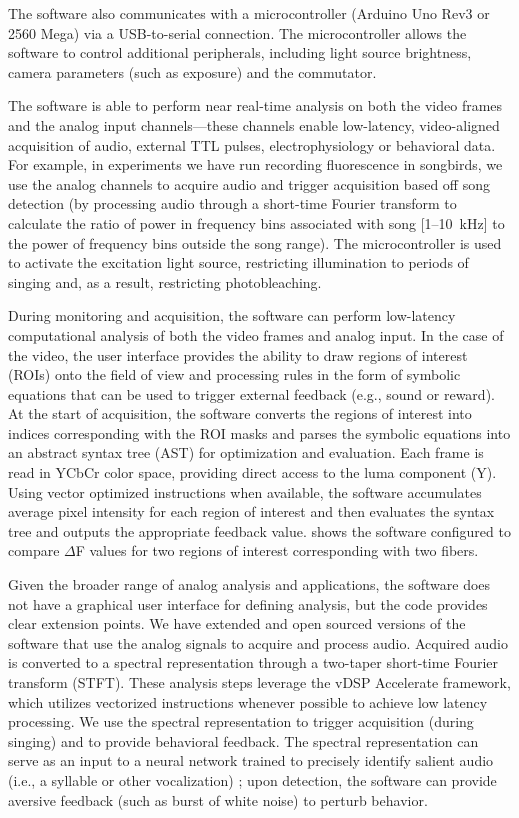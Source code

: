 The software also communicates with a microcontroller 
(Arduino Uno Rev3 or 2560 Mega) via a USB-to-serial connection. The 
microcontroller allows the software to control additional 
peripherals, including light source brightness, camera parameters 
(such as exposure) and the commutator.

The software is able to perform near real-time analysis on both the 
video frames and the analog input channels---these channels enable
low-latency, video-aligned acquisition of audio, external TTL 
pulses, electrophysiology or behavioral data. 
For example, in experiments we have run recording fluorescence in songbirds, 
we use the analog channels to acquire audio and trigger acquisition 
based off song detection (by processing audio through a short-time
Fourier transform to calculate the ratio of power in frequency 
bins associated with song [1--10~kHz] to the power of frequency bins outside 
the song range). The microcontroller is used to activate 
the excitation light source, restricting illumination to periods of 
singing and, as a result, restricting photobleaching. 

During monitoring and acquisition, the software can perform low-latency
computational analysis of both the video frames and analog input. In 
the case of the video, the user interface provides the ability to 
draw regions of interest (ROIs) onto the field of view and processing 
rules in the form of symbolic equations that can be used to trigger 
external feedback (e.g., sound or reward). At the start of
acquisition, the software converts the regions of interest into indices 
corresponding with the ROI masks and parses the symbolic equations 
into an abstract syntax tree (AST) for optimization and evaluation. 
Each frame is read in YCbCr color 
space, providing direct access to the luma component (Y). Using vector
optimized instructions when available, the software accumulates average 
pixel intensity for each region of interest and then evaluates the 
syntax tree and outputs the appropriate feedback value.  
shows the software configured to compare $\Delta$F values for two 
regions of interest corresponding with two fibers.

Given the broader range of analog analysis and applications, 
the software does not have a graphical 
user interface for defining analysis, but the code provides clear 
extension points. We have extended and open sourced versions 
of the software that use the analog signals to acquire and process 
audio. Acquired audio is converted to a spectral representation 
through a two-taper short-time Fourier transform (STFT). These 
analysis steps leverage the vDSP Accelerate framework, which 
utilizes vectorized instructions whenever possible to achieve 
low latency processing. We use the spectral representation to 
trigger acquisition (during singing) and to provide behavioral
feedback. The spectral 
representation can serve as an input to a neural network trained 
to precisely identify salient audio (i.e., a syllable or other 
vocalization) \cite{Pearre:2017cs}; upon detection, the software 
can provide aversive feedback (such as burst of white noise) 
to perturb behavior.

